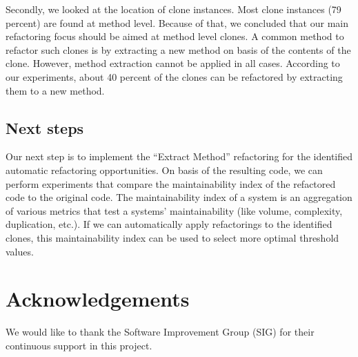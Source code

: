 \documentclass[a4paper]{article}
\begin{document}
Secondly, we looked at the location of clone instances. Most clone instances (79 percent) are found at method level. Because of that, we concluded that our main refactoring focus should be aimed at method level clones. A common method to refactor such clones is by extracting a new method on basis of the contents of the clone. However, method extraction cannot be applied in all cases. According to our experiments, about 40 percent of the clones can be refactored by extracting them to a new method.

\subsection{Next steps}
Our next step is to implement the ``Extract Method'' refactoring for the identified automatic refactoring opportunities. On basis of the resulting code, we can perform experiments that compare the maintainability index of the refactored code to the original code. The maintainability index of a system is an aggregation of various metrics that test a systems' maintainability (like volume, complexity, duplication, etc.). If we can automatically apply refactorings to the identified clones, this maintainability index can be used to select more optimal threshold values.

\section*{Acknowledgements}
We would like to thank the Software Improvement Group (SIG) for their continuous support in this project.



\end{document}
